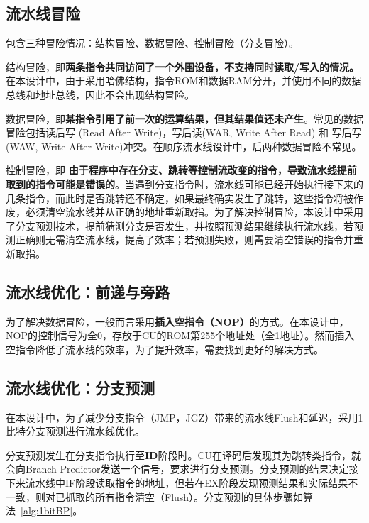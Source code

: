\documentclass[lang=cn,a4paper,newtx]{elegantpaper}
\begin{document}
\subsection{流水线冒险}
包含三种冒险情况：结构冒险、数据冒险、控制冒险（分支冒险）。\cite{zhihu453232311}

结构冒险，即\textbf{两条指令共同访问了一个外围设备，不支持同时读取/写入的情况。}在本设计中，由于采用哈佛结构，指令ROM和数据RAM分开，并使用不同的数据总线和地址总线，因此不会出现结构冒险。

数据冒险，即\textbf{某指令引用了前一次的运算结果，但其结果值还未产生}。常见的数据冒险包括读后写 (Read After Write)，写后读(WAR, Write After Read) 和 写后写(WAW, Write After Write)冲突。在顺序流水线设计中，后两种数据冒险不常见。

控制冒险，即 \textbf{由于程序中存在分支、跳转等控制流改变的指令，导致流水线提前取到的指令可能是错误的}。当遇到分支指令时，流水线可能已经开始执行接下来的几条指令，而此时是否跳转还不确定，如果最终确实发生了跳转，这些指令将被作废，必须清空流水线并从正确的地址重新取指。为了解决控制冒险，本设计中采用了分支预测技术，提前猜测分支是否发生，并按照预测结果继续执行流水线，若预测正确则无需清空流水线，提高了效率；若预测失败，则需要清空错误的指令并重新取指。
\subsection{流水线优化：前递与旁路}
为了解决数据冒险，一般而言采用\textbf{插入空指令（NOP）}的方式。在本设计中，NOP的控制信号为全0，存放于CU的ROM第255个地址处（全1地址）。然而插入空指令降低了流水线的效率，为了提升效率，需要找到更好的解决方式。
\subsection{流水线优化：分支预测}
在本设计中，为了减少分支指令（JMP，JGZ）带来的流水线Flush和延迟，采用1比特分支预测进行流水线优化。

分支预测发生在分支指令执行至\textbf{ID}阶段时。CU在译码后发现其为跳转类指令，就会向Branch Predictor发送一个信号，要求进行分支预测。分支预测的结果决定接下来流水线中IF阶段读取指令的地址，但若在EX阶段发现预测结果和实际结果不一致，则对已抓取的所有指令清空（Flush）。分支预测的具体步骤如算法~\ref{alg:1bitBP}。
\end{document}
